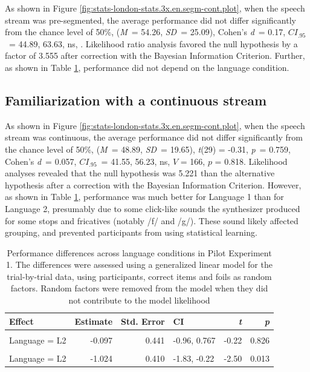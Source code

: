 \documentclass[]{article}
\newcommand{\T}{{\em t\/}}
\newcommand{\p}{{\em p\/}}
\newcommand{\M}{{\em M\/}}
\newcommand{\SD}{{\em SD\/}}
\newcommand{\D}{Cohen's {\em d\/}}
\newcommand{\CI}{$CI_{.95}$}
\begin{document}
As shown in Figure \ref{fig:stats-london-stats.3x.en.segm-cont.plot}, when the speech stream was pre-segmented, the average performance did not differ significantly from the chance level of 50\%, (\M~= 54.26, \SD~= 25.09), \D~= 0.17, \CI~= 44.89, 63.63, ns, . Likelihood ratio analysis favored the null hypothesis by a factor of 3.555 after correction with the Bayesian Information Criterion. Further, as shown in Table \ref{tab:stats.en.lang.glmm}, performance did not depend on the language condition.

\subsection{Familiarization with a continuous stream}\label{app:exp_en1_cont}

As shown in Figure \ref{fig:stats-london-stats.3x.en.segm-cont.plot}, when the speech stream was continuous, the average performance did not differ significantly from the chance level of 50\%, (\M~= 48.89, \SD~= 19.65), \T(29) = -0.31, \p~= 0.759, \D~= 0.057, \CI~= 41.55, 56.23, ns, \(V\) = 166, \(p\) = 0.818. Likelihood analyses revealed that the null hypothesis was 5.221 than the alternative hypothesis after a correction with the Bayesian Information Criterion. However, as shown in Table \ref{tab:stats.en.lang.glmm}, performance was much better for Language 1 than for Language 2, presumably due to some click-like sounds the synthesizer produced for some stops and fricatives (notably /f/ and /g/). These sound likely affected grouping, and prevented participants from using statistical learning.

\begin{table}

\caption{\label{tab:stats-london-stats.en.lang.glmm.print}\label{tab:stats.en.lang.glmm}Performance differences across language conditions in Pilot Experiment 1. The differences were assessed using a generalized linear model for the trial-by-trial data, using participants, correct items and foils as random factors. Random factors were removed from the model when they did not contribute to the model likelihood}
\centering
\begin{tabular}[t]{lrrlrr}
\toprule
Effect & Estimate & Std. Error & CI & \T & \p\\
\midrule
\addlinespace[0.3em]
\multicolumn{6}{l}{\textbf{Pre-segmented}}\\
\hspace{1em}Language = L2 & -0.097 & 0.441 & -0.96, 0.767 & -0.22 & 0.826\\
\addlinespace[0.3em]
\multicolumn{6}{l}{\textbf{Continuous}}\\
\hspace{1em}Language = L2 & -1.024 & 0.410 & -1.83, -0.22 & -2.50 & 0.013\\
\bottomrule
\end{tabular}
\end{table}
\end{document}

